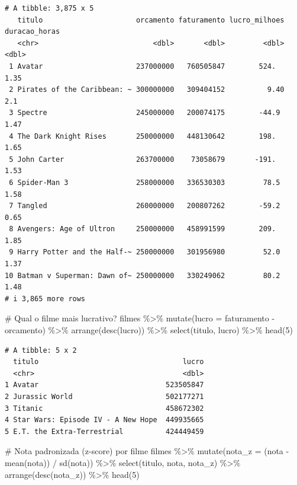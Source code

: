 \documentclass[
  letterpaper,
]{scrbook}
\newenvironment{Shaded}{\begin{snugshade}}{\end{snugshade}}
\newcommand{\AttributeTok}[1]{\textcolor[rgb]{0.40,0.45,0.13}{#1}}
\newcommand{\CommentTok}[1]{\textcolor[rgb]{0.37,0.37,0.37}{#1}}
\newcommand{\DecValTok}[1]{\textcolor[rgb]{0.68,0.00,0.00}{#1}}
\newcommand{\FunctionTok}[1]{\textcolor[rgb]{0.28,0.35,0.67}{#1}}
\newcommand{\NormalTok}[1]{\textcolor[rgb]{0.00,0.23,0.31}{#1}}
\newcommand{\SpecialCharTok}[1]{\textcolor[rgb]{0.37,0.37,0.37}{#1}}
\begin{document}
\begin{verbatim}
# A tibble: 3,875 x 5
   titulo                      orcamento faturamento lucro_milhoes duracao_horas
   <chr>                           <dbl>       <dbl>         <dbl>         <dbl>
 1 Avatar                      237000000   760505847        524.            1.35
 2 Pirates of the Caribbean: ~ 300000000   309404152          9.40          2.1 
 3 Spectre                     245000000   200074175        -44.9           1.47
 4 The Dark Knight Rises       250000000   448130642        198.            1.65
 5 John Carter                 263700000    73058679       -191.            1.53
 6 Spider-Man 3                258000000   336530303         78.5           1.58
 7 Tangled                     260000000   200807262        -59.2           0.65
 8 Avengers: Age of Ultron     250000000   458991599        209.            1.85
 9 Harry Potter and the Half-~ 250000000   301956980         52.0           1.37
10 Batman v Superman: Dawn of~ 250000000   330249062         80.2           1.48
# i 3,865 more rows
\end{verbatim}

\begin{Shaded}
\begin{Highlighting}[]
\CommentTok{\# Qual o filme mais lucrativo?}
\NormalTok{filmes }\SpecialCharTok{\%\textgreater{}\%} 
  \FunctionTok{mutate}\NormalTok{(}\AttributeTok{lucro =}\NormalTok{ faturamento }\SpecialCharTok{{-}}\NormalTok{ orcamento) }\SpecialCharTok{\%\textgreater{}\%} 
  \FunctionTok{arrange}\NormalTok{(}\FunctionTok{desc}\NormalTok{(lucro)) }\SpecialCharTok{\%\textgreater{}\%} 
  \FunctionTok{select}\NormalTok{(titulo, lucro) }\SpecialCharTok{\%\textgreater{}\%} 
  \FunctionTok{head}\NormalTok{(}\DecValTok{5}\NormalTok{)}
\end{Highlighting}
\end{Shaded}

\begin{verbatim}
# A tibble: 5 x 2
  titulo                                  lucro
  <chr>                                   <dbl>
1 Avatar                              523505847
2 Jurassic World                      502177271
3 Titanic                             458672302
4 Star Wars: Episode IV - A New Hope  449935665
5 E.T. the Extra-Terrestrial          424449459
\end{verbatim}

\begin{Shaded}
\begin{Highlighting}[]
\CommentTok{\# Nota padronizada (z{-}score) por filme}
\NormalTok{filmes }\SpecialCharTok{\%\textgreater{}\%} 
  \FunctionTok{mutate}\NormalTok{(}\AttributeTok{nota\_z =}\NormalTok{ (nota }\SpecialCharTok{{-}} \FunctionTok{mean}\NormalTok{(nota)) }\SpecialCharTok{/} \FunctionTok{sd}\NormalTok{(nota)) }\SpecialCharTok{\%\textgreater{}\%} 
  \FunctionTok{select}\NormalTok{(titulo, nota, nota\_z) }\SpecialCharTok{\%\textgreater{}\%} 
  \FunctionTok{arrange}\NormalTok{(}\FunctionTok{desc}\NormalTok{(nota\_z)) }\SpecialCharTok{\%\textgreater{}\%} 
  \FunctionTok{head}\NormalTok{(}\DecValTok{5}\NormalTok{)}
\end{Highlighting}
\end{Shaded}
\end{document}
